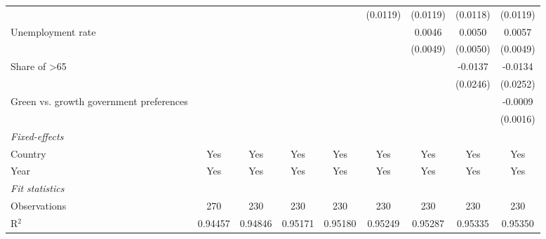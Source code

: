 \begin{table}[htbp]
\begin{tabular}{lcccccccc}
                                                                       &          &          &                &                & (0.0119)       & (0.0119)       & (0.0118)       & (0.0119)\\   
      Unemployment rate                                                &          &          &                &                &                & 0.0046         & 0.0050         & 0.0057\\   
                                                                       &          &          &                &                &                & (0.0049)       & (0.0050)       & (0.0049)\\   
      Share of >65                                                     &          &          &                &                &                &                & -0.0137        & -0.0134\\   
                                                                       &          &          &                &                &                &                & (0.0246)       & (0.0252)\\   
      Green vs. growth government preferences                          &          &          &                &                &                &                &                & -0.0009\\   
                                                                       &          &          &                &                &                &                &                & (0.0016)\\   
      \midrule
      \emph{Fixed-effects}\\
      Country                                                          & Yes      & Yes      & Yes            & Yes            & Yes            & Yes            & Yes            & Yes\\  
      Year                                                             & Yes      & Yes      & Yes            & Yes            & Yes            & Yes            & Yes            & Yes\\  
      \midrule
      \emph{Fit statistics}\\
      Observations                                                     & 270      & 230      & 230            & 230            & 230            & 230            & 230            & 230\\  
      R$^2$                                                            & 0.94457  & 0.94846  & 0.95171        & 0.95180        & 0.95249        & 0.95287        & 0.95335        & 0.95350\\  

\end{tabular}
\end{table}
